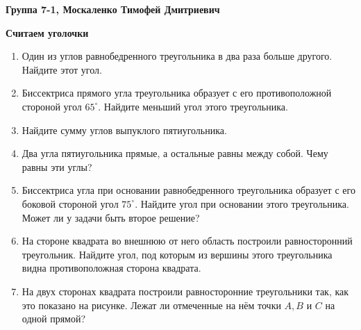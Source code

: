 \documentclass{article}
\begin{document}
\large
	
	\begin{center}
		\textbf{Группа 7-1, Москаленко Тимофей Дмитриевич}
	\end{center}
	\begin{center}
		\textbf{Считаем уголочки}
	\end{center}
	
	
	\begin{enumerate}[label*=\protect\fbox{\arabic{enumi}}]
		\item Один из углов равнобедренного треугольника в два раза больше другого. Найдите этот угол.
		\item Биссектриса прямого угла треугольника образует с его противоположной стороной угол $65^\circ$. Найдите меньший угол этого треугольника.
		\item Найдите сумму углов выпуклого пятиугольника.
		\item Два угла пятиугольника прямые, а остальные равны между собой. Чему равны эти углы?
		\item Биссектриса угла при основании равнобедренного треугольника образует с его боковой стороной угол $75^\circ$. Найдите угол при основании этого треугольника. Может ли у задачи быть второе решение?
		\item На стороне квадрата во внешнюю от него область построили равносторонний треугольник. Найдите угол, под которым из вершины этого треугольника видна противоположная сторона квадрата.
		\item На двух сторонах квадрата построили равносторонние треугольники так, как это показано на рисунке. Лежат ли отмеченные на нём точки $A, B$ и $C$ на одной прямой?
	\end{enumerate}
	
\end{document}
